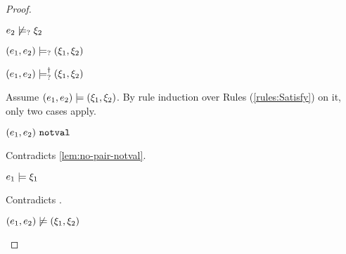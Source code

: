 \begin{proof}
\begin{byCases}
\begin{byCases}
\begin{byCases}
\begin{pfsteps*}
            \item $e_2 \not\models_{?} \xi_2$  
            \item $(e_1 , e_2) \models_{?} (\xi_1 , \xi_2)$  
            \item $(e_1 , e_2) \models_{?}^{\dag} (\xi_1 , \xi_2)$ 
            \end{pfsteps*}
            Assume $(e_1 , e_2) \models (\xi_1 , \xi_2)$. By rule induction over Rules (\ref{rules:Satisfy}) on it, only two cases apply. 
           \begin{byCases}
            \item[\text{(\ref{rule:CSNotValPair})}]
                \begin{pfsteps*}
                \item $(e_1 , e_2) ~\mathtt{notval}$ 
                \end{pfsteps*}
                Contradicts \autoref{lem:no-pair-notval}.
            \item[\text{(\ref{rule:CSPair})}]
                \begin{pfsteps*}
                \item $e_1 \models \xi_1$ 
                \end{pfsteps*}
                Contradicts .
            \end{byCases}
            \begin{pfsteps*}
            \item $(e_1 , e_2) \not\models (\xi_1 , \xi_2)$  
            \end{pfsteps*}
            

\end{byCases}
\end{byCases}
\end{byCases}
\end{proof}
